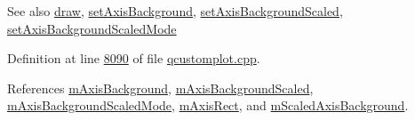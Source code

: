 \begin{DoxySeeAlso}{See also}
\hyperlink{a00116_a2e9b3d14dffa43c79835869d488936c9}{draw}, \hyperlink{a00116_a010330bf3686716b9f7d643b3f5205db}{set\+Axis\+Background}, \hyperlink{a00116_a55ad8c13d7db8b5c2f15d694773a43a3}{set\+Axis\+Background\+Scaled}, \hyperlink{a00116_a82920d0db6cc36214dc4a9dfe386d1a1}{set\+Axis\+Background\+Scaled\+Mode} 
\end{DoxySeeAlso}


Definition at line \hyperlink{a00115_source_l08090}{8090} of file \hyperlink{a00115_source}{qcustomplot.\+cpp}.



References \hyperlink{a00116_source_l02124}{m\+Axis\+Background}, \hyperlink{a00116_source_l02125}{m\+Axis\+Background\+Scaled}, \hyperlink{a00116_source_l02126}{m\+Axis\+Background\+Scaled\+Mode}, \hyperlink{a00116_source_l02111}{m\+Axis\+Rect}, and \hyperlink{a00116_source_l02136}{m\+Scaled\+Axis\+Background}.



